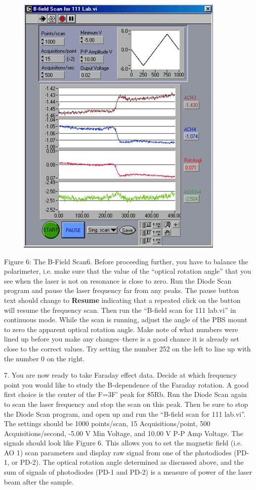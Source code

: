 \documentclass{../lab}
\begin{document}
\begin{figure}[h]
    \centering
    \href{http://experimentationlab.berkeley.edu/sites/default/files/images/MNOimage020.jpg}{\includegraphics[width=0.5\linewidth]{images/MNOimage020.jpg}}
    \caption{}
    \label{fig:MNOimage020}
\end{figure}


Figure 6: The B-Field Scan6. Before proceeding further, you have to balance the polarimeter, i.e. make sure that the value of the ``optical rotation angle'' that you see when the laser is not on resonance is close to zero. Run the Diode Scan program and pause the laser frequency far from any peaks. The pause button text should change to \textbf{Resume} indicating that a repeated click on the button will resume the frequency scan. Then run the ``B-field scan for 111 lab.vi'' in continuous mode. While the scan is running, adjust the angle of the PBS mount to zero the apparent optical rotation angle. Make note of what numbers were lined up before you make any changes--there is a good chance it is already set close to the correct values. Try setting the number 252 on the left to line up with the number 0 on the right.

7. You are now ready to take Faraday effect data. Decide at which frequency point you would like to study the B-dependence of the Faraday rotation. A good first choice is the center of the F=3F' peak for 85Rb. Run the Diode Scan again to scan the laser frequency and stop the scan on this peak. Then be sure to stop the Diode Scan program, and open up and run the ``B-field scan for 111 lab.vi''. The settings should be 1000 points/scan, 15 Acquisitions/point, 500 Acquisitions/second, -5.00 V Min Voltage, and 10.00 V P-P Amp Voltage. The signals should look like Figure 6. This allows you to set the magnetic field (i.e. AO 1) scan parameters and display raw signal from one of the photodiodes (PD-1, or PD-2). The optical rotation angle determined as discussed above, and the sum of signals of photodiodes (PD-1 and PD-2) is a measure of power of the laser beam after the sample.
\end{document}
